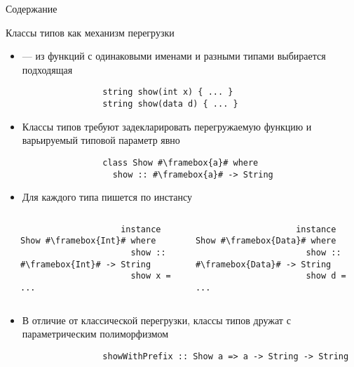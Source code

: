     \begin{frame}[noframenumbering]{Содержание}
        \tableofcontents
    \end{frame}


    \begin{frame}[fragile]{Классы типов как механизм перегрузки}
        \begin{itemize}
            \item {} --- из функций с одинаковыми именами и разными типами выбирается подходящая
            \begin{verbatim}
                string show(int x) { ... }
                string show(data d) { ... }
            \end{verbatim}
            \item Классы типов требуют задекларировать перегружаемую функцию и варьируемый типовой параметр явно
            \begin{verbatim}
                class Show #\framebox{a}# where
                  show :: #\framebox{a}# -> String
            \end{verbatim}
            \item Для каждого типа пишется по инстансу
        \end{itemize}
        \vspace{-1.2em}
        \begin{columns}[onlytextwidth]
            \begin{column}[t]{0.05\textwidth}
            \end{column}\hfill%
            \begin{column}[t]{0.485\textwidth}
                \begin{verbatim}
                    instance Show #\framebox{Int}# where
                      show :: #\framebox{Int}# -> String
                      show x = ...
                \end{verbatim}
            \end{column}\hfill%
            \begin{column}[t]{0.485\textwidth}
                \begin{verbatim}
                    instance Show #\framebox{Data}# where
                      show :: #\framebox{Data}# -> String
                      show d = ...
                \end{verbatim}
            \end{column}
        \end{columns}
        \vspace{0.5em}
        \begin{itemize}
            \item В отличие от классической перегрузки, классы типов дружат с параметрическим полиморфизмом
            \begin{verbatim}
                showWithPrefix :: Show a => a -> String -> String
            \end{verbatim}
        \end{itemize}
    \end{frame}

